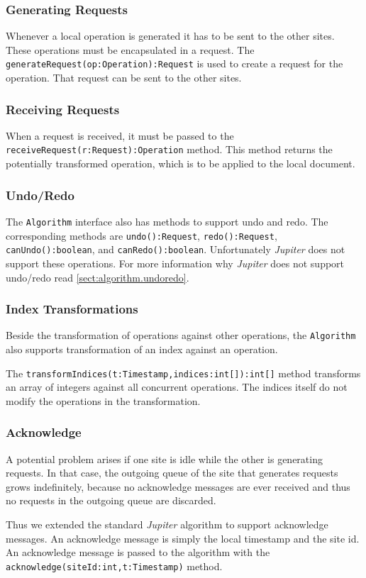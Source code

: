 \subsubsection{Generating Requests}
Whenever a local operation is generated it has to be sent to the other sites.
These operations must be encapsulated in a request. The
\texttt{generateRequest(op:Operation):Request} is used to create a request
for the operation. That request can be sent to the other sites.

\subsubsection{Receiving Requests}
When a request is received, it must be passed to the
\texttt{receiveRequest(r:Request):Operation} method. This method returns
the potentially transformed operation, which is to be applied to the
local document.

\subsubsection{Undo/Redo}
The \texttt{Algorithm} interface also has methods to support undo and redo.
The corresponding methods are \texttt{undo():Request}, \texttt{redo():Request},
\texttt{canUndo():boolean}, and \texttt{canRedo():boolean}. Unfortunately
\emph{Jupiter} does not support these operations. For more information why
\emph{Jupiter} does not support undo/redo read \ref{sect:algorithm.undoredo}.

\subsubsection{Index Transformations}
Beside the transformation of operations against other operations, the
\texttt{Algorithm} also supports transformation of an index against an
operation. 

The \texttt{transformIndices(t:Timestamp,indices:int[]):int[]} method transforms
an array of integers against all concurrent operations. The indices itself
do not modify the operations in the transformation.

\subsubsection{Acknowledge}
A potential problem arises if one site is idle while the other is generating
requests. In that case, the outgoing queue of the site that generates requests
grows indefinitely, because no acknowledge messages are ever received and thus
no requests in the outgoing queue are discarded.

Thus we extended the standard \emph{Jupiter} algorithm to support acknowledge
messages. An acknowledge message is simply the local timestamp and the site
id. An acknowledge message is passed to the algorithm with the
\texttt{acknowledge(siteId:int,t:Timestamp)} method.



